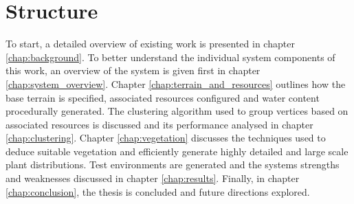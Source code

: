 \section{Structure}

To start, a detailed overview of existing work is presented in chapter \ref{chap:background}. To better understand the individual system components of this work, an overview of the system is given first in chapter \ref{chap:system_overview}. Chapter \ref{chap:terrain_and_resources} outlines how the base terrain is specified, associated resources configured and water content procedurally generated. The clustering algorithm used to group vertices based on associated resources is discussed and its performance analysed in chapter \ref{chap:clustering}. Chapter \ref{chap:vegetation} discusses the techniques used to deduce suitable vegetation and efficiently generate highly detailed and large scale plant distributions. Test environments are generated and the systems strengths and weaknesses discussed in chapter \ref{chap:results}. Finally, in chapter \ref{chap:conclusion}, the thesis is concluded and future directions explored.
